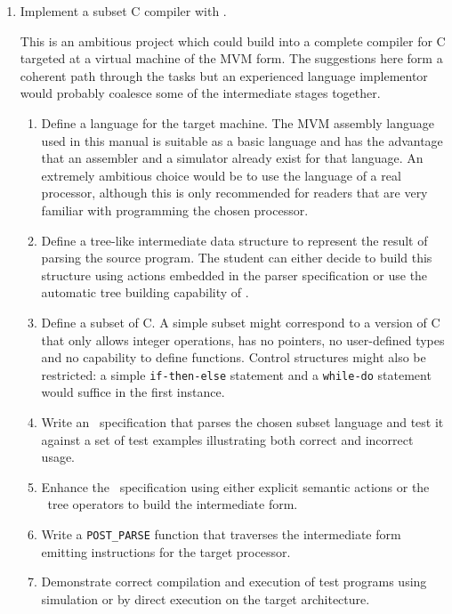 \begin{enumerate}
\item Implement a subset C compiler with \rdp.

This is an ambitious project which could build into a complete compiler
for C targeted at a virtual machine of the MVM form. The suggestions
here form a coherent path through the tasks but an experienced language
implementor would probably coalesce some of the intermediate stages
together.

\begin{enumerate}

\item Define a language for the target machine. The MVM assembly
language used in this manual is suitable as a basic language and has the
advantage that an assembler and a simulator already exist for that
language. An extremely ambitious choice would be to use the language of a real
processor, although this is only recommended for readers that are very
familiar with programming the chosen processor.

\item Define a tree-like intermediate data structure to represent the
result of parsing the source program. The student can either decide to
build this structure using actions embedded in the parser specification
or use the automatic tree building capability of \rdp.

\item Define a subset of C. A simple subset might correspond to a
version of C that only allows integer operations, has no pointers, no
user-defined types and no capability to define functions. Control
structures might also be restricted: a simple {\tt if-then-else}
statement  and a {\tt while-do} statement would suffice in the first
instance.

\item Write an \rdp\ specification that parses the chosen subset
language and test it against a set of test examples illustrating both
correct and incorrect usage.

\item Enhance the \rdp\ specification using either explicit semantic
actions or the \rdp\ tree operators to build the intermediate form.

\item Write a \verb+POST_PARSE+ function that traverses the intermediate
form emitting instructions for the target processor.

\item Demonstrate correct compilation and execution of test programs
using simulation or by direct execution on the target architecture.


\end{enumerate}
\end{enumerate}
